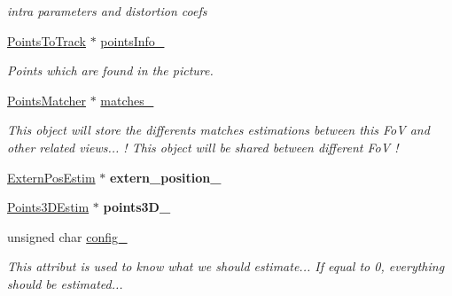 \begin{DoxyCompactItemize}
\begin{DoxyCompactList}\small\item\em intra parameters and distortion coefs \end{DoxyCompactList}\item 
\hypertarget{class_opencv_sf_m_1_1_field_of_view_a77cd3559de42f6a458272f784f17687f}{
\hyperlink{class_opencv_sf_m_1_1_points_to_track}{PointsToTrack} $\ast$ \hyperlink{class_opencv_sf_m_1_1_field_of_view_a77cd3559de42f6a458272f784f17687f}{pointsInfo\_\-}}
\label{class_opencv_sf_m_1_1_field_of_view_a77cd3559de42f6a458272f784f17687f}

\begin{DoxyCompactList}\small\item\em Points which are found in the picture. \end{DoxyCompactList}\item 
\hypertarget{class_opencv_sf_m_1_1_field_of_view_a2e55ed099fa404ede90edbc8652135a5}{
\hyperlink{class_opencv_sf_m_1_1_points_matcher}{PointsMatcher} $\ast$ \hyperlink{class_opencv_sf_m_1_1_field_of_view_a2e55ed099fa404ede90edbc8652135a5}{matches\_\-}}
\label{class_opencv_sf_m_1_1_field_of_view_a2e55ed099fa404ede90edbc8652135a5}

\begin{DoxyCompactList}\small\item\em This object will store the differents matches estimations between this FoV and other related views... ! This object will be shared between different FoV ! \end{DoxyCompactList}\item 
\hypertarget{class_opencv_sf_m_1_1_field_of_view_a7ddc8c9468643260946a927a302f9d7f}{
\hyperlink{class_opencv_sf_m_1_1_extern_pos_estim}{ExternPosEstim} $\ast$ {\bfseries extern\_\-position\_\-}}
\label{class_opencv_sf_m_1_1_field_of_view_a7ddc8c9468643260946a927a302f9d7f}

\item 
\hypertarget{class_opencv_sf_m_1_1_field_of_view_a5045c21d7eeaeed2293a1e2d7bbb9a9d}{
\hyperlink{class_opencv_sf_m_1_1_points3_d_estim}{Points3DEstim} $\ast$ {\bfseries points3D\_\-}}
\label{class_opencv_sf_m_1_1_field_of_view_a5045c21d7eeaeed2293a1e2d7bbb9a9d}

\item 
\hypertarget{class_opencv_sf_m_1_1_field_of_view_af47e74bc88efc7af4e1f6f802217561c}{
unsigned char \hyperlink{class_opencv_sf_m_1_1_field_of_view_af47e74bc88efc7af4e1f6f802217561c}{config\_\-}}
\label{class_opencv_sf_m_1_1_field_of_view_af47e74bc88efc7af4e1f6f802217561c}

\begin{DoxyCompactList}\small\item\em This attribut is used to know what we should estimate... If equal to 0, everything should be estimated... \end{DoxyCompactList}\end{DoxyCompactItemize}


